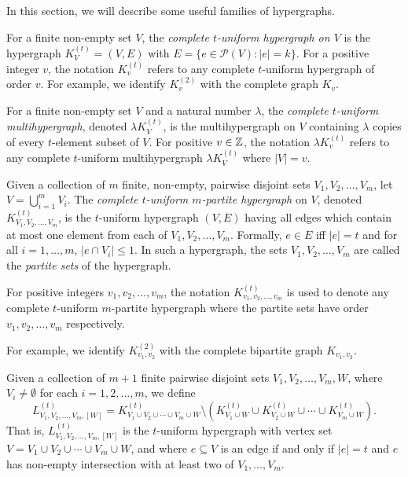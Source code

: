In this section, we will describe some useful families of hypergraphs.

For a finite non-empty set $V$, the {\em complete $t$-uniform hypergraph on $V$}
is the hypergraph $K_V^{(t)} = (V, E)$ with $E = \{e \in \mathcal{P}(V) : |e| = k\}$.
For a positive integer $v$, the notation $K_v^{(t)}$ refers to any complete
$t$-uniform hypergraph of order $v$.
For example, we identify $K_v^{(2)}$ with the complete graph $K_v$.

For a finite non-empty set $V$ and a natural number $\lambda$, the {\em complete
$t$-uniform multihypergraph}, denoted $\lambda K_{V}^{(t)}$, is the
multihypergraph on $V$ containing $\lambda$ copies of every $t$-element subset
of $V$. For positive $v \in \mathbb{Z}$, the notation $\lambda K_{v}^{(t)}$ refers to
any complete $t$-uniform multihypergraph $\lambda K_{V}^{(t)}$ where $|V| = v$.

Given a collection of $m$ finite, non-empty, pairwise disjoint sets
$V_1, V_2, \ldots, V_m$, let $V = \bigcup_{i=1}^{m} V_i$.
The {\em complete $t$-uniform $m$-partite hypergraph} on $V$, denoted
$K_{V_1, V_2, \ldots, V_m}^{(t)}$, is the $t$-uniform hypergraph $(V, E)$ having
all edges which contain at most one element from each of $V_1, V_2, \ldots, V_m$.
Formally, $e \in E$ iff $|e| = t$ and for all $i=1,\ldots,m$, $|e \cap V_i| \leq 1$.
In such a hypergraph, the sets $V_1, V_2, \ldots, V_m$ are called the
{\em partite sets} of the hypergraph.

For positive integers $v_1, v_2, \ldots, v_m$, the notation $K_{v_1, v_2,
\ldots, v_m}^{(t)}$ is used to denote any complete $t$-uniform $m$-partite
hypergraph where the partite sets have order $v_1, v_2, \ldots, v_m$
respectively.

For example, we identify $K_{v_1, v_2}^{(2)}$ with the complete bipartite graph
$K_{v_1,v_2}$.

Given a collection of $m+1$ finite pairwise disjoint sets
$V_1, V_2, \ldots, V_m, W$, where $V_i \neq \emptyset$ for each $i = 1, 2, \ldots, m$, we define
\[
    L_{V_1, V_2, \ldots, V_m, [W]}^{(t)} = K_{V_1 \cup V_2 \cup \cdots \cup V_m \cup W}^{(t)} \setminus (K_{V_1 \cup W}^{(t)} \cup K_{V_2 \cup W}^{(t)} \cup \cdots \cup K_{V_m \cup W}^{(t)}).
\]
That is, $L_{V_1, V_2, \ldots, V_m, [W]}^{(t)}$ is the $t$-uniform hypergraph with vertex set $V = V_1 \cup V_2 \cup \cdots \cup V_m \cup W$, and where $e \subseteq V$ is an edge if and only if $|e| = t$ and $e$ has non-empty intersection with at least two of $V_1, \ldots, V_m$.

